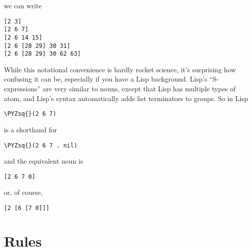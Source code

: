we can write

\begin{framed_shaded}
\begin{Verbatim}[fontsize=\relsize{-2.5},fontseries=b,commandchars=\\\{\}]
[2 3]
[2 6 7]
[2 6 14 15]
[2 6 [28 29] 30 31]
[2 6 [28 29] 30 62 63]
\end{Verbatim}
\end{framed_shaded}

While this notational convenience is hardly rocket science, it's
surprising how confusing it can be, especially if you have a Lisp
background.  Lisp's ``S-expressions'' are very similar to nouns,
except that Lisp has multiple types of atom, and Lisp's syntax
automatically adds list terminators to groups.  So in Lisp

\begin{framed_shaded}
\begin{Verbatim}[fontsize=\relsize{-2.5},fontseries=b,commandchars=\\\{\}]
\PYZsq{}(2 6 7)
\end{Verbatim}
\end{framed_shaded}

is a shorthand for

\begin{framed_shaded}
\begin{Verbatim}[fontsize=\relsize{-2.5},fontseries=b,commandchars=\\\{\}]
\PYZsq{}(2 6 7 . nil)
\end{Verbatim}
\end{framed_shaded}

and the equivalent noun is

\begin{framed_shaded}
\begin{Verbatim}[fontsize=\relsize{-2.5},fontseries=b,commandchars=\\\{\}]
[2 6 7 0]
\end{Verbatim}
\end{framed_shaded}

or, of course,

\begin{framed_shaded}
\begin{Verbatim}[fontsize=\relsize{-2.5},fontseries=b,commandchars=\\\{\}]
[2 [6 [7 0]]]
\end{Verbatim}
\end{framed_shaded}

\section{Rules}

